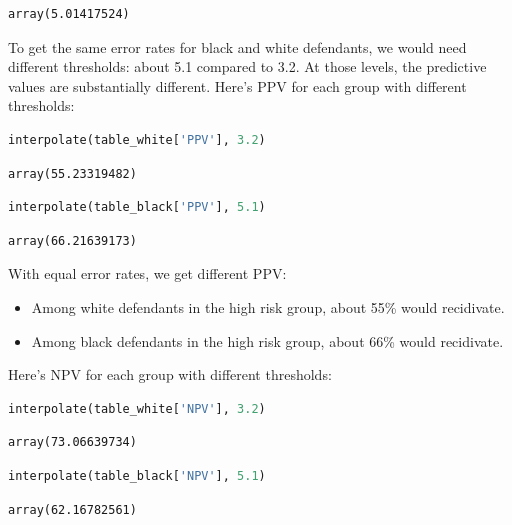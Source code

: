\begin{lstlisting}[]
array(5.01417524)
\end{lstlisting}

To get the same error rates for black and white defendants, we would
need different thresholds: about 5.1 compared to 3.2. At those levels,
the predictive values are substantially different. Here's PPV for each
group with different thresholds:

\begin{lstlisting}[language=Python]
interpolate(table_white['PPV'], 3.2)
\end{lstlisting}

\begin{lstlisting}[]
array(55.23319482)
\end{lstlisting}

\begin{lstlisting}[language=Python]
interpolate(table_black['PPV'], 5.1)
\end{lstlisting}

\begin{lstlisting}[]
array(66.21639173)
\end{lstlisting}

With equal error rates, we get different PPV:

\begin{itemize}
\item
  Among white defendants in the high risk group, about 55\% would
  recidivate.
\item
  Among black defendants in the high risk group, about 66\% would
  recidivate.
\end{itemize}

Here's NPV for each group with different thresholds:

\begin{lstlisting}[language=Python]
interpolate(table_white['NPV'], 3.2)
\end{lstlisting}

\begin{lstlisting}[]
array(73.06639734)
\end{lstlisting}

\begin{lstlisting}[language=Python]
interpolate(table_black['NPV'], 5.1)
\end{lstlisting}

\begin{lstlisting}[]
array(62.16782561)
\end{lstlisting}

